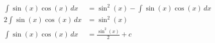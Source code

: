 \documentclass[preview]{standalone}
\begin{document}
\begin{align*}
\int \sin(x)\cos(x) \, dx &= \sin^2(x) - \int \sin(x)\cos(x) \, dx \\ 2\int \sin(x)\cos(x)\, dx&= \sin^2(x) \\ \int \sin(x)\cos(x)\, dx &= \frac{\sin^2(x)}{2} + c
\end{align*}
\end{document}
